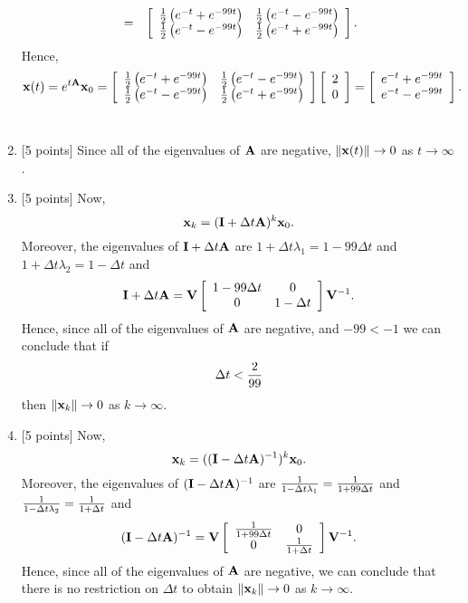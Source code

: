 \begin{solution}
\begin{enumerate}
\begin{eqnarray*}
\\
&=&\left[\begin{array}{cc}{1\over2}\left(e^{-t}+e^{-99t}\right) & {1\over2}\left(e^{-t} - e^{-99t}\right) \\ {1\over2}\left(e^{-t}-e^{-99t}\right) & {1\over2}\left(e^{-t}+e^{-99t}\right)\end{array}\right].
\end{eqnarray*}
Hence,
\[
{\bf x}(t) = e^{t{\bf A}} {\bf x}_0 = \left[\begin{array}{cc}{1\over2}\left(e^{-t}+e^{-99t}\right) & {1\over2}\left(e^{-t} - e^{-99t}\right) \\ {1\over2}\left(e^{-t}-e^{-99t}\right) & {1\over2}\left(e^{-t}+e^{-99t}\right)\end{array}\right]\left[\begin{array}{c}2 \\ 0\end{array}\right] = \left[\begin{array}{c}e^{-t}+e^{-99t} \\ e^{-t}-e^{-99t}\end{array}\right].
\]
\\
\item {[5 points]} Since all of the eigenvalues of ${\bf A}$ are negative, $\|{\bf x}(t)\|\rightarrow0$ as $t\rightarrow\infty$.
\\
\item {[5 points]} Now,
\[
{\bf x}_k = ({\bf I}+\Delta t {\bf A})^k {\bf x}_0.
\]
Moreover, the eigenvalues of ${\bf I}+\Delta t {\bf A}$ are $1+\Delta t \lambda_1 = 1-99\Delta t$ and $1+\Delta t \lambda_2 = 1-\Delta t$ and
\[
{\bf I}+\Delta t {\bf A}={\bf V} \left[\begin{array}{cc}1-99\Delta t & 0 \\ 0 & 1-\Delta t\end{array}\right] {\bf V}^{-1}.
\]
Hence, since all of the eigenvalues of ${\bf A}$ are negative, and $-99<-1$ we can conclude that if
\[
\Delta t<{2\over 99}
\]
then $\|{\bf x}_k\|\rightarrow0$ as $k\to\infty$.
\\
\item {[5 points]} Now,
\[
{\bf x}_k = (({\bf I}-\Delta t {\bf A})^{-1})^k {\bf x}_0.
\]
Moreover, the eigenvalues of $({\bf I}-\Delta t{\bf A})^{-1}$ are ${1\over 1-\Delta t \lambda_1} = {1\over 1+99\Delta t}$ and ${1\over 1-\Delta t \lambda_2} = {1\over 1+\Delta t}$ and
\[
({\bf I}-\Delta t{\bf A})^{-1}={\bf V} \left[\begin{array}{cc}{1\over 1+99\Delta t} & 0 \\ 0 & {1\over 1+\Delta t}\end{array}\right] {\bf V}^{-1}.
\]
Hence, since all of the eigenvalues of ${\bf A}$ are negative, we can conclude that there is no restriction on $\Delta t$ to obtain $\|{\bf x}_k\|\rightarrow0$ as $k\to\infty$.
\end{enumerate}
\end{solution}